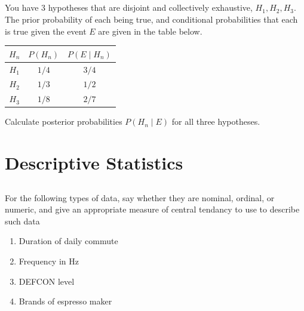 \documentclass[twocolumn]{article}
\begin{document}
\subsection{}

    You have 3 hypotheses that are disjoint and collectively exhaustive, $H_1, H_2, H_3$. The prior probability of each being true, and conditional probabilities that each is true given the event $E$ are given in the table below.

    \begin{table}[h!]
        \centering
        \begin{tabular}{c | c | c }
            \toprule
            $H_n$ & $P(H_n)$ & $P(E \mid H_n)$ \\
            \midrule
            $H_1$ & ${1}/{4}$ & ${3}/{4}$  \\
            $H_2$ & ${1}/{3}$ & ${1}/{2}$  \\
            $H_3$ & ${1}/{8}$ & ${2}/{7}$ \\
            \bottomrule
        \end{tabular}
    \end{table}

    Calculate posterior probabilities $P( H_n \mid E)$ for all three hypotheses.
    

\clearpage
\section{Descriptive Statistics}

\subsection{}

    For the following types of data, say whether they are nominal, ordinal, or numeric, and give an appropriate measure of central tendancy to use to describe such data

    \begin{enumerate}
        \item Duration of daily commute
        \item Frequency in Hz
        \item DEFCON level
        \item Brands of espresso maker
    \end{enumerate}

\subsection{}
\end{document}
